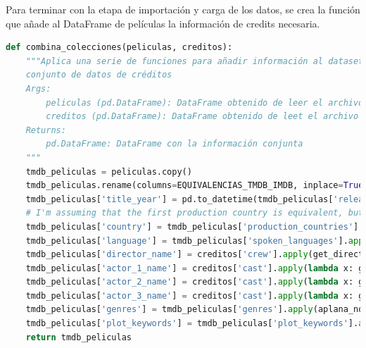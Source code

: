 Para terminar con la etapa de importación y carga de los datos, se crea la función que añade al DataFrame de películas la información de credits necesaria.
\begin{lstlisting}[language=Python, caption= {El conjunto de datos se encuentra en dos ficheros separados y con estructuras diferentes. Se juntan esas dos colecciones un un único conjunto de datos.}]
def combina_colecciones(peliculas, creditos):
    """Aplica una serie de funciones para añadir información al dataset de películas a partir del
    conjunto de datos de créditos
    Args:
        peliculas (pd.DataFrame): DataFrame obtenido de leer el archivo de películas
        creditos (pd.DataFrame): DataFrame obtenido de leet el archivo de créditos
    Returns:
        pd.DataFrame: DataFrame con la información conjunta
    """
    tmdb_peliculas = peliculas.copy()
    tmdb_peliculas.rename(columns=EQUIVALENCIAS_TMDB_IMDB, inplace=True)
    tmdb_peliculas['title_year'] = pd.to_datetime(tmdb_peliculas['release_date']).apply(lambda x: x.year)
    # I'm assuming that the first production country is equivalent, but have not been able to validate this
    tmdb_peliculas['country'] = tmdb_peliculas['production_countries'].apply(lambda x: get_elemento(x, [0, 'name']))
    tmdb_peliculas['language'] = tmdb_peliculas['spoken_languages'].apply(lambda x: get_elemento(x, [0, 'name']))
    tmdb_peliculas['director_name'] = creditos['crew'].apply(get_director)
    tmdb_peliculas['actor_1_name'] = creditos['cast'].apply(lambda x: get_elemento(x, [1, 'name']))
    tmdb_peliculas['actor_2_name'] = creditos['cast'].apply(lambda x: get_elemento(x, [2, 'name']))
    tmdb_peliculas['actor_3_name'] = creditos['cast'].apply(lambda x: get_elemento(x, [3, 'name']))
    tmdb_peliculas['genres'] = tmdb_peliculas['genres'].apply(aplana_nombres)
    tmdb_peliculas['plot_keywords'] = tmdb_peliculas['plot_keywords'].apply(aplana_nombres)
    return tmdb_peliculas
\end{lstlisting}

